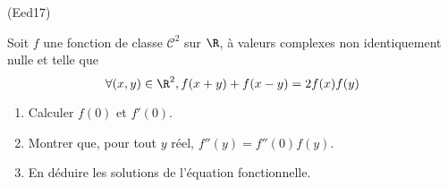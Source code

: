 \begin{tiny}(Eed17)\end{tiny} Soit $f$ une fonction de classe $\mathcal{C}^2$ sur $\R$, à valeurs complexes non identiquement nulle et telle que
\begin{displaymath}
  \forall(x,y)\in \R^2,
  f(x+y) + f(x-y) = 2f(x)f(y)
\end{displaymath}
\begin{enumerate}
  \item Calculer $f(0)$ et $f'(0)$.
  \item Montrer que, pour tout $y$ réel, $f''(y) = f''(0)f(y)$.
  \item En déduire les solutions de l'équation fonctionnelle.
\end{enumerate}
